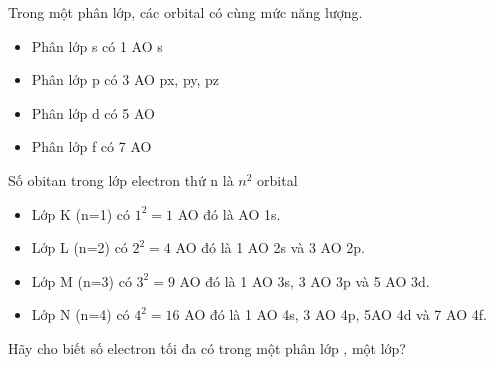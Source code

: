 \begin{tomtat}
	Trong một phân lớp, các orbital có cùng mức năng lượng.
	\begin{itemize}
		\item Phân lớp s có 1 AO s
		\item Phân lớp p có 3 AO px, py, pz
		\item Phân lớp d có 5 AO 
		\item Phân lớp f có 7 AO 
	\end{itemize}
\end{tomtat}
\begin{tomtat}
	Số obitan trong lớp electron thứ n là $n^2$ orbital
	\begin{itemize}
		\item Lớp K (n=1) có $1^2 =1$ AO đó là AO 1s.
		\item Lớp L (n=2) có $2^2 =4$ AO đó là 1 AO 2s và 3 AO 2p.
		\item Lớp M (n=3) có $3^2 =9$ AO đó là 1 AO 3s, 3 AO 3p và  5 AO 3d.
		\item Lớp N (n=4) có $4^2 =16$ AO đó là 1 AO 4s, 3 AO 4p, 5AO 4d và 7 AO 4f.
	\end{itemize}
\end{tomtat}
\begin{hoivadap}
	\begin{cauhoi}
		Hãy cho biết số electron  tối đa có trong một phân lớp , một lớp?
	\end{cauhoi}
\end{hoivadap}
